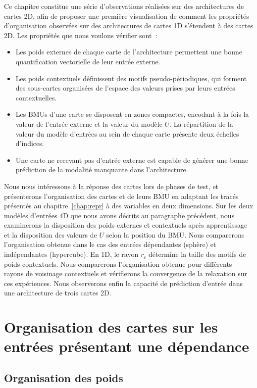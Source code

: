 \documentclass[../main]{subfiles}
\begin{document}
Ce chapitre constitue une série d'observations réalisées sur des architectures de cartes 2D, afin de proposer une première visualisation de comment les propriétés d'organisation observées sur des architectures de cartes 1D s'étendent à des cartes 2D.
Les propriétés que nous voulons vérifier sont~:
\begin{itemize}
	\item Les poids externes de chaque carte de l'architecture permettent une bonne quantification vectorielle de leur entrée externe.
	\item Les poids contextuels définissent des motifs pseudo-périodiques, qui forment des sous-cartes organisées de l'espace des valeurs prises par leurs entrées contextuelles.
	\item Les BMUs d'une carte se disposent en zones compactes, encodant à la fois la valeur de l'entrée externe et la valeur du modèle $U$. La répartition de la valeur du modèle d'entrées au sein de chaque carte présente deux échelles d'indices.
	\item Une carte ne recevant pas d'entrée externe est capable de générer une bonne prédiction de la modalité manquante dans l'architecture.
\end{itemize}

Nous nous intéressons à la réponse des cartes lors de phases de test, et présenterons l'organisation des cartes et de leurs BMU en adaptant les tracés présentés au chapitre~\ref{chap:repr} à des variables en deux dimensions.
Sur les deux modèles d'entrées 4D que nous avons décrits au paragraphe précédent, nous examinerons la disposition des poids externes et contextuels après apprentissage et la disposition des valeurs de $U$ selon la position du BMU. Nous comparerons l'organisation obtenue dans le cas des entrées dépendantes (sphère) et indépendantes (hypercube).
En 1D, le rayon $r_c$ détermine la taille des motifs de poids contextuels. Nous comparerons l'organisation obtenue pour différents rayons de voisinage contextuels et vérifierons la convergence de la relaxation sur ces expériences. Nous observerons enfin la capacité de prédiction d'entrée dans une architecture de trois cartes 2D.

\section{Organisation des cartes sur les entrées présentant une dépendance \label{par:orga2D}}

\subsection{Organisation des poids}
\end{document}
